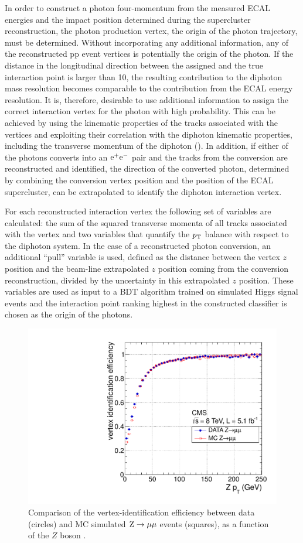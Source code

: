 \documentclass[11pt,twoside,a4paper,cmspaper,final,collab]{cms-tdr}
\begin{document}
In order to construct a photon four-momentum from the measured ECAL energies and the impact position
determined during the supercluster reconstruction, the photon production vertex, \ie the origin
of the photon trajectory, must be determined. Without incorporating any additional information, any of the
reconstructed pp event vertices is potentially the origin of the photon. If the distance
in the longitudinal direction
between the assigned and the true interaction point is
larger than 10\mm, the resulting contribution to the diphoton mass resolution becomes
comparable to the contribution from the ECAL energy resolution. It is, therefore, desirable
to use additional information to assign the correct interaction vertex for the photon with high probability.
This can be achieved by using the kinematic properties
of the tracks associated with the vertices and exploiting their correlation with
the diphoton kinematic properties, including the transverse momentum
of the diphoton
(\ptgg).
In addition, if either of the photons converts into an $\mathrm{e}^+\mathrm{e}^-$ pair
and the tracks from the conversion are reconstructed and identified, the direction of
the converted photon, determined by combining the conversion vertex position and the position of the
ECAL supercluster, can be extrapolated to identify the diphoton
interaction vertex.

For each reconstructed interaction vertex the following set of variables are calculated:
the sum of the squared transverse momenta of all tracks associated with the vertex
and two variables that  quantify the $p_{\mathrm{T}}$ balance with respect to the diphoton system.
In the case of a reconstructed photon conversion, an additional
 ``pull'' variable is used,
defined as the distance between the vertex $z$ position and the beam-line extrapolated $z$ position
coming from the conversion reconstruction, divided by the uncertainty in this extrapolated $z$ position.
These variables are used as input to a BDT algorithm trained on simulated Higgs signal events
and the interaction point ranking highest in the constructed classifier
is chosen as the origin of the photons.

\begin{figure}[htbp]
  \begin{center}
    \includegraphics[width=0.49\linewidth]{figures/hgg_vertex_efficiencyVsPt22June.pdf}
    \caption{
      Comparison of the vertex-identification efficiency between data (circles)
      and MC simulated $\mathrm{Z}\to\mu\mu$ events (squares), as a function of the $Z$ boson \pt.
    }
    \label{fig:hgg_vtxeff}
  \end{center}
\end{figure}
\end{document}
